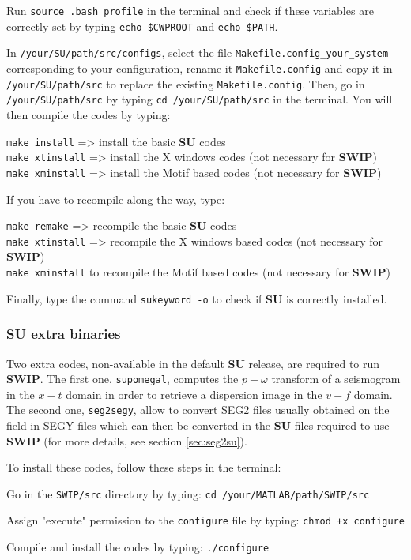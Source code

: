 \documentclass[twoside,a4paper]{article}
\def\SWIP{\textbf{SWIP}}
\def\SU{\textbf{SU}}
\begin{document}
Run \verb|source .bash_profile| in the terminal and check if these variables are correctly set by typing \verb|echo $CWPROOT| and \verb|echo $PATH|.

In \verb|/your/SU/path/src/configs|, select the file \verb|Makefile.config_your_system| corresponding to your configuration, rename it \verb|Makefile.config| and copy it in \verb|/your/SU/path/src| to replace the existing \verb|Makefile.config|. Then, go in \verb|/your/SU/path/src| by typing \verb|cd /your/SU/path/src| in the terminal. You will then compile the codes by typing:

\verb|make install| => install the basic {\SU} codes\\
\verb|make xtinstall| => install the X windows codes (not necessary for {\SWIP})\\
\verb|make xminstall| => install the Motif based codes (not necessary for {\SWIP})

If you have to recompile along the way, type:

\verb|make remake| => recompile the basic {\SU} codes\\
\verb|make xtinstall| => recompile the X windows based codes (not necessary for {\SWIP})\\
\verb|make xminstall| to recompile the Motif based codes (not necessary for {\SWIP})

Finally, type the command \verb|sukeyword -o| to check if {\SU} is correctly installed.

\subsubsection{SU extra binaries}
Two extra codes, non-available in the default {\SU} release, are required to run {\SWIP}. The first one, \verb|supomegal|, computes the $p-\omega$ transform of a seismogram in the $x-t$ domain in order to retrieve a dispersion image in the $v-f$ domain. The second one, \verb|seg2segy|, allow to convert SEG2 files usually obtained on the field in SEGY files which can then be converted in the {\SU} files required to use {\SWIP} (for more details, see section \ref{sec:seg2su}).

To install these codes, follow these steps in the terminal:

Go in the \verb|SWIP/src| directory by typing: \verb|cd /your/MATLAB/path/SWIP/src|

Assign "execute" permission to the \verb|configure| file by typing: \verb|chmod +x configure|

Compile and install the codes by typing: \verb|./configure|
\end{document}
